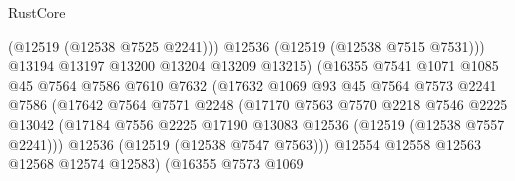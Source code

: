 \begin{lexlean}{RustCore}
\begin{coremodule}
                                        (@12519 (@12538 @7525 @2241)))
                                      @12536
                                      (@12519 (@12538 @7515 @7531)))
                                    @13194
                                    @13197
                                    @13200
                                    @13204
                                    @13209
                                    @13215)
                                  (@16355
                                    @7541
                                    @1071
                                    @1085
                                    @45
                                    @7564
                                    @7586
                                    @7610
                                    @7632
                                    (@17632
                                      @1069
                                      @93
                                      @45
                                      @7564
                                      @7573
                                      @2241
                                      @7586
                                      (@17642
                                        @7564
                                        @7571
                                        @2248
                                        (@17170
                                          @7563
                                          @7570
                                          @2218
                                          @7546
                                          @2225
                                          @13042
                                          (@17184
                                            @7556
                                            @2225
                                            @17190
                                            @13083
                                            @12536
                                            (@12519 (@12538 @7557 @2241)))
                                          @12536
                                          (@12519 (@12538 @7547 @7563)))
                                        @12554
                                        @12558
                                        @12563
                                        @12568
                                        @12574
                                        @12583)
                                      (@16355
                                        @7573
                                        @1069

\end{coremodule}
\end{lexlean}
